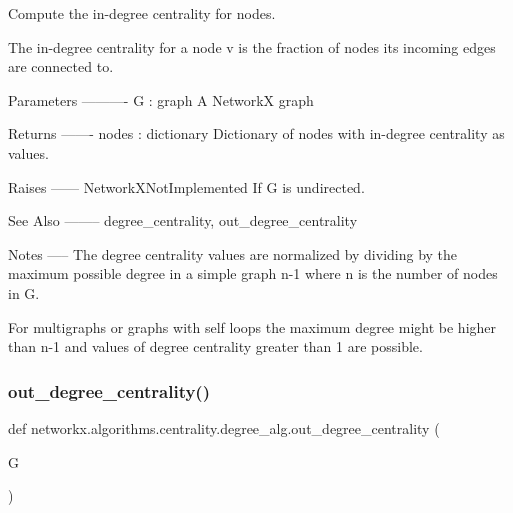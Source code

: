 \begin{DoxyVerb}Compute the in-degree centrality for nodes.

The in-degree centrality for a node v is the fraction of nodes its
incoming edges are connected to.

Parameters
----------
G : graph
    A NetworkX graph

Returns
-------
nodes : dictionary
    Dictionary of nodes with in-degree centrality as values.

Raises
------
NetworkXNotImplemented
    If G is undirected.

See Also
--------
degree_centrality, out_degree_centrality

Notes
-----
The degree centrality values are normalized by dividing by the maximum
possible degree in a simple graph n-1 where n is the number of nodes in G.

For multigraphs or graphs with self loops the maximum degree might
be higher than n-1 and values of degree centrality greater than 1
are possible.
\end{DoxyVerb}
 \mbox{\label{namespacenetworkx_1_1algorithms_1_1centrality_1_1degree__alg_a3ac985a84d8b050ed24d926bb17bb090}} 
\subsubsection{\texorpdfstring{out\+\_\+degree\+\_\+centrality()}{out\_degree\_centrality()}}
{\footnotesize\ttfamily def networkx.\+algorithms.\+centrality.\+degree\+\_\+alg.\+out\+\_\+degree\+\_\+centrality (\begin{DoxyParamCaption}\item[{}]{G }\end{DoxyParamCaption})}

